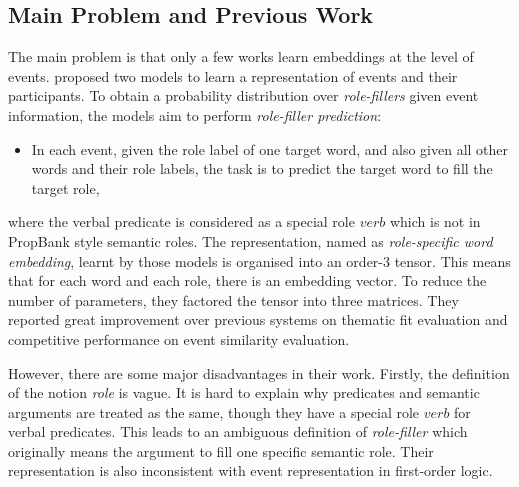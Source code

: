 \documentclass[a4paper]{article}
\begin{document}
\subsection{Main Problem and Previous Work}
The main problem is that only a few works learn embeddings at the level of events. \citet{tilk2016event} proposed two models to learn a representation of events and their participants. To obtain a probability distribution over \textit{role-fillers} given event information, the models aim to perform \textit{role-filler prediction}: 
\begin{itemize}
    \item  In each event, given the role label of one target word, and also given all other words and their role labels, the task is to predict the target word to fill the target role,
\end{itemize}
where the verbal predicate is considered as a special role $verb$ which is not in PropBank style semantic roles. The representation, named as \textit{role-specific word embedding}, learnt by those models is organised into an order-3 tensor. This means that for each word and each role, there is an embedding vector. To reduce the number of parameters, they factored the tensor into three matrices. They reported great improvement over previous systems on thematic fit evaluation and competitive performance on event similarity evaluation. 

However, there are some major disadvantages in their work. Firstly, the definition of the notion \textit{role} is vague. It is hard to explain why predicates and semantic arguments are treated as the same, though they have a special role $verb$ for verbal predicates. This leads to an ambiguous definition of \textit{role-filler} which originally means the argument to fill one specific semantic role. Their representation is also inconsistent with event representation in first-order logic. 
\end{document}

